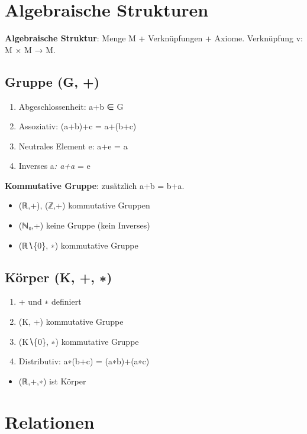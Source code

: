 \documentclass[11pt, a4paper]{article}
\begin{document}
\section{Algebraische Strukturen}

\textbf{Algebraische Struktur}: Menge M + Verknüpfungen + Axiome. Verknüpfung v: M × M → M.



\subsection{Gruppe (G, +)}
\begin{enumerate}
  \item Abgeschlossenheit: a+b ∈ G
  \item Assoziativ: (a+b)+c = a+(b+c)
  \item Neutrales Element e: a+e = a
  \item Inverses a\textit{: a+a} = e
\end{enumerate}

\textbf{Kommutative Gruppe}: zusätzlich a+b = b+a.

\begin{itemize}
  \item (ℝ,+), (ℤ,+) kommutative Gruppen
  \item (ℕ₀,+) keine Gruppe (kein Inverses)
  \item (ℝ∖\{0\}, ∗) kommutative Gruppe
\end{itemize}


\subsection{Körper (K, +, ∗)}
\begin{enumerate}
  \item + und ∗ definiert
  \item (K, +) kommutative Gruppe
  \item (K∖\{0\}, ∗) kommutative Gruppe
  \item Distributiv: a∗(b+c) = (a∗b)+(a∗c)
\end{enumerate}

\begin{itemize}
  \item (ℝ,+,∗) ist Körper
\end{itemize}


\section{Relationen}
\end{document}
